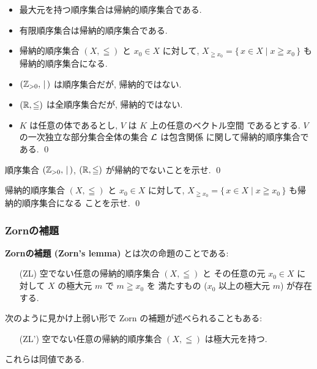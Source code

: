 \documentclass[12pt,twoside]{jarticle}
\begin{document}
\begin{example}[帰納的順序集合およびそうでない順序集合の例]
  \quad
  \begin{itemize}
  \item 最大元を持つ順序集合は帰納的順序集合である.
  \item 有限順序集合は帰納的順序集合である.
  \item 帰納的順序集合 $(X,\leqq)$ と $x_0\in X$ に対して, %
    $X_{\geqq x_0} = \{\,x\in X \mid x \geqq x_0 \,\}$ も帰納的順序集合になる.
  \item $({\mathbb Z}_{>0},\,\mid\,)$ は順序集合だが, 帰納的ではない.
  \item $({\mathbb R}, \leqq)$ は全順序集合だが, 帰納的ではない.
  \item $K$ は任意の体であるとし, $V$ は $K$ 上の任意のベクトル空間
    であるとする. $V$ の一次独立な部分集合全体の集合 ${\mathcal L}$ は包含関係
    に関して帰納的順序集合である.
    \qed
  \end{itemize}
\end{example}

\begin{question}[5点]
  順序集合 $({\mathbb Z}_{>0},\,\mid\,)$, $({\mathbb R}, \leqq)$ が帰納的でないことを示せ.
  \qed
\end{question}

\begin{question}[5点]
  \label{q:indord-subset}
  帰納的順序集合 $(X,\leqq)$ と $x_0\in X$ に対して, %
  $X_{\geqq x_0} = \{\,x\in X \mid x \geqq x_0 \,\}$ も帰納的順序集合になる
  ことを示せ. 
  \qed
\end{question}


\subsubsection{Zornの補題}

{\bf Zornの補題 (Zorn's lemma)} とは次の命題のことである:
\begin{itemize}
\item[(ZL)] 空でない任意の帰納的順序集合 $(X,\leqq)$ と
  その任意の元 $x_0\in X$ に対して $X$ の極大元 $m$ で $m\geqq x_0$ を
  満たすもの ($x_0$ 以上の極大元 $m$) が存在する.
\end{itemize}
次のように見かけ上弱い形で Zorn の補題が述べられることもある:
\begin{itemize}
\item[(ZL')] 空でない任意の帰納的順序集合 $(X,\leqq)$ は極大元を持つ.
\end{itemize}
これらは同値である.
\end{document}
